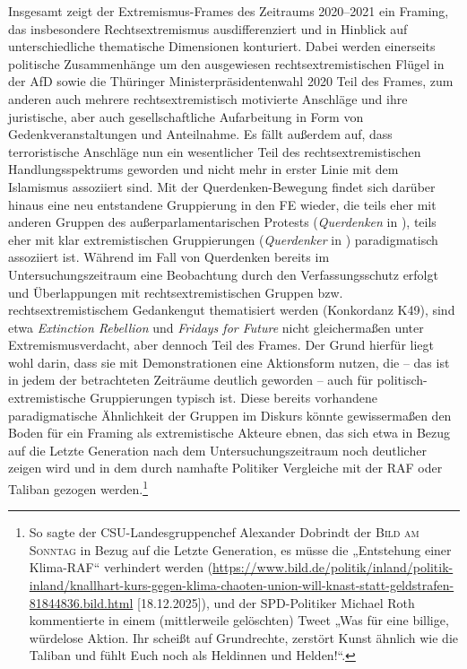 Insgesamt zeigt der Extremismus-Frames des Zeitraums 2020--2021 ein Framing, das insbesondere Rechtsextremismus ausdifferenziert und in Hinblick auf unterschiedliche thematische Dimensionen konturiert. Dabei werden einerseits politische Zusammenhänge um den ausgewiesen rechtsextremistischen Flügel in der AfD sowie die Thüringer Ministerpräsidentenwahl 2020 Teil des Frames, zum anderen auch mehrere rechtsextremistisch motivierte Anschläge und ihre juristische, aber auch gesellschaftliche Aufarbeitung in Form von Gedenkveranstaltungen und Anteilnahme. Es fällt außerdem auf, dass terroristische Anschläge nun ein wesentlicher Teil des rechtsextremistischen Handlungsspektrums geworden und nicht mehr in erster Linie mit dem Islamismus assoziiert sind. Mit der Querdenken-Bewegung findet sich darüber hinaus eine neu entstandene Gruppierung in den FE wieder, die teils eher mit anderen Gruppen des außerparlamentarischen Protests (\emph{Querdenken} in ), teils eher mit klar extremistischen Gruppierungen (\emph{Querdenker} in ) paradigmatisch assoziiert ist. Während im Fall von Querdenken bereits im Untersuchungszeitraum eine Beobachtung durch den Verfassungsschutz erfolgt und Überlappungen mit rechtsextremistischen Gruppen bzw. rechtsextremistischem Gedankengut thematisiert werden (Konkordanz K49), sind etwa \emph{Extinction Rebellion} und \emph{Fridays for Future} nicht gleichermaßen unter Extremismusverdacht, aber dennoch Teil des Frames. Der Grund hierfür liegt wohl darin, dass sie mit Demonstrationen eine Aktionsform nutzen, die -- das ist in jedem der betrachteten Zeiträume deutlich geworden -- auch für politisch-extremistische Gruppierungen typisch ist. Diese bereits vorhandene paradigmatische Ähnlichkeit der Gruppen im Diskurs könnte gewissermaßen den Boden für ein Framing als extremistische Akteure ebnen, das sich etwa in Bezug auf die Letzte Generation nach dem Untersuchungszeitraum noch deutlicher zeigen wird und in dem durch namhafte Politiker Vergleiche mit der RAF oder Taliban gezogen werden.\footnote{So sagte der CSU-Landesgruppenchef Alexander Dobrindt der \textsc{Bild am Sonntag} in Bezug auf die Letzte Generation, es müsse die „Entstehung einer Klima-RAF`` verhindert werden (\url{https://www.bild.de/politik/inland/politik-inland/knallhart-kurs-gegen-klima-chaoten-union-will-knast-statt-geldstrafen-81844836.bild.html} {[}18.12.2025{]}), und der SPD-Politiker Michael Roth kommentierte in einem (mittlerweile gelöschten) Tweet „Was für eine billige, würdelose Aktion. Ihr scheißt auf Grundrechte, zerstört Kunst ähnlich wie die Taliban und fühlt Euch noch als Heldinnen und Helden!{}``.}

